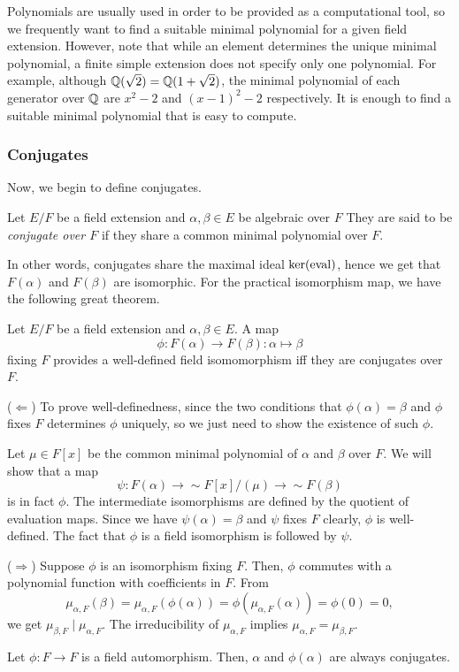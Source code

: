 \documentclass{../exp}
\begin{document}
\begin{rmk}
Polynomials are usually used in order to be provided as a computational tool, so we frequently want to find a suitable minimal polynomial for a given field extension.
However, note that while an element determines the unique minimal polynomial, a finite simple extension does not specify only one polynomial.
For example, although $\mathbb{Q}(\sqrt2)=\mathbb{Q}(1+\sqrt2)$, the minimal polynomial of each generator over $\mathbb{Q}$ are $x^2-2$ and $(x-1)^2-2$ respectively.
It is enough to find a suitable minimal polynomial that is easy to compute.
\end{rmk}

\subsubsection{Conjugates}
Now, we begin to define conjugates.

\begin{defn}
Let $E/F$ be a field extension and $\alpha,\beta\in E$ be algebraic over $F$
They are said to be \emph{conjugate over $F$} if they share a common minimal polynomial over $F$.
\end{defn}

In other words, conjugates share the maximal ideal $\ker(\operatorname{eval})$, hence we get that $F(\alpha)$ and $F(\beta)$ are isomorphic.
For the practical isomorphism map, we have the following great theorem.

\begin{thm}
Let $E/F$ be a field extension and $\alpha,\beta\in E$.
A map
\[\phi:F(\alpha)\to F(\beta):\alpha\mapsto\beta\]
fixing $F$ provides a well-defined field isomomorphism iff they are conjugates over $F$.
\end{thm}
\begin{pf}
($\Leftarrow$)
To prove well-definedness, since the two conditions that $\phi(\alpha)=\beta$ and $\phi$ fixes $F$ determines $\phi$ uniquely, so we just need to show the existence of such $\phi$.

Let $\mu\in F[x]$ be the common minimal polynomial of $\alpha$ and $\beta$ over $F$.
We will show that a map
\[\psi:F(\alpha)\to{\sim}F[x]/(\mu)\to{\sim}F(\beta)\]
is in fact $\phi$.
The intermediate isomorphisms are defined by the quotient of evaluation maps.
Since we have $\psi(\alpha)=\beta$ and $\psi$ fixes $F$ clearly, $\phi$ is well-defined.
The fact that $\phi$ is a field isomorphism is followed by $\psi$.

($\Rightarrow$)
Suppose $\phi$ is an isomorphism fixing $F$.
Then, $\phi$ commutes with a polynomial function with coefficients in $F$.
From
\[\mu_{\alpha,F}(\beta)=\mu_{\alpha,F}(\phi(\alpha))=\phi(\mu_{\alpha,F}(\alpha))=\phi(0)=0,\]
we get $\mu_{\beta,F}\mid\mu_{\alpha,F}$.
The irreducibility of $\mu_{\alpha,F}$ implies $\mu_{\alpha,F}=\mu_{\beta,F}$.
\end{pf}
\begin{cor}
Let $\phi:F\to F$ is a field automorphism.
Then, $\alpha$ and $\phi(\alpha)$ are always conjugates.
\end{cor}
\end{document}
